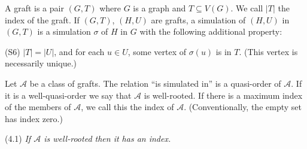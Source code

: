 A graft is a pair $(G, T)$ where $G$ is a graph and $T \subseteq V(G)$. We call $|T|$ the index of the graft. If $(G, T)$, $(H, U)$ are grafts, a simulation of $(H, U)$ in $(G, T)$ is a simulation $\sigma$ of $H$ in $G$ with the following additional property:

\hspace*{12pt}(S6) $|T| = |U|$, and for each $u \in U$, some vertex of $\sigma(u)$ is in $T$. (This vertex is necessarily unique.)

Let $\mathscr{A}$ be a class of grafts. The relation ``is simulated in'' is a quasi-order of $\mathscr{A}$. If it is a well-quasi-order we say that $\mathscr{A}$ is well-rooted. If there is a maximum index of the members of $\mathscr{A}$, we call this the index of $\mathscr{A}$. (Conventionally, the empty set has index zero.)

\stmt
(4.1) \textit{If $\mathscr{A}$ is well-rooted then it has an index.}
